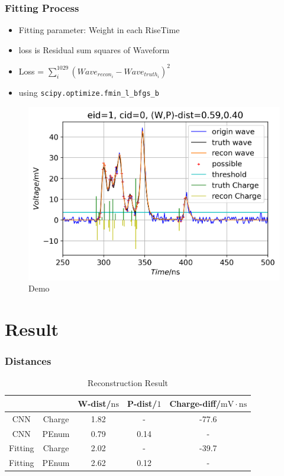 \documentclass[handout]{beamer}
\begin{document}
\begin{frame}
\frametitle{Fitting Process}
\begin{itemize}
    \item Fitting parameter: Weight in each RiseTime
    \item loss is Residual sum squares of Waveform
    \item Loss = $\sum_{i}^{1029}(Wave_{recon_i}-Wave_{truth_i})^{2}$
    \item using \lstinline{scipy.optimize.fmin_l_bfgs_b}
\end{itemize}
\setlength{\belowcaptionskip}{0mm}
\begin{figure}
    \centering
    \caption{Demo}
    \includegraphics[width=0.7\linewidth]{img/demo.png}
\end{figure}
\end{frame}

    

\section{Result}
\begin{frame}
\frametitle{Distances}
\begin{table}
    \centering
    \caption{Reconstruction Result}
    \begin{tabular}{c|c|c|c|c}
        \hline
        &  & W-dist/$\mathrm{ns}$ & P-dist/$\mathrm{1}$ & Charge-diff/$\mathrm{mV}\cdot\mathrm{ns}$ \\
        \hline
        CNN & Charge & 1.82 & - & -77.6 \\
        \hline
        CNN & PEnum & 0.79 & 0.14 & - \\
        \hline
        Fitting & Charge & 2.02 & - & -39.7 \\
        \hline
        Fitting & PEnum & 2.62 & 0.12 & - \\
        \hline
    \end{tabular}
\end{table}
\end{frame}
\end{document}
